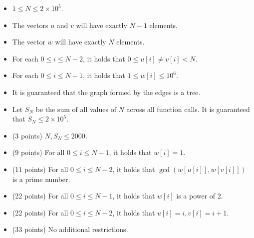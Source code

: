 \documentclass[12pt]{scrartcl}
\begin{document}
        \begin{itemize}
            \item $1 \le N \le 2\times10^5$.
            \item The vectors $u$ and $v$ will have exactly $N - 1$ elements.
            \item The vector $w$ will have exactly $N$ elements.
            \item For each $0 \le i \le N - 2$, it holds that $0 \le u[i] \neq v[i] < N$. 
            \item For each $0 \le i \le N - 1$, it holds that $1 \le w[i] \le 10^6$.
            \item It is guaranteed that the graph formed by the edges is a tree.
            \item Let $S_N$ be the sum of all values of $N$ across all function calls. It is guaranteed that $S_N \le 2\times 10^5$.
        \end{itemize}
    


    \begin{itemize}
        \item (3 points) $N, S_N \le 2000$.
        \item (9 points) For all $0 \le i \le N - 1$, it holds that $w[i] = 1$.
        \item (11 points) For all $0 \le i \le N - 2$, it holds that $\gcd(w[u[i]], w[v[i]])$ is a prime number.
        \item (22 points) For all $0 \le i \le N - 1$, it holds that $w[i]$ is a power of 2.
        \item (22 points) For all $0 \le i \le N - 2$, it holds that $u[i] = i, v[i] = i + 1$.
        \item (33 points) No additional restrictions.
    \end{itemize}
\end{document}
